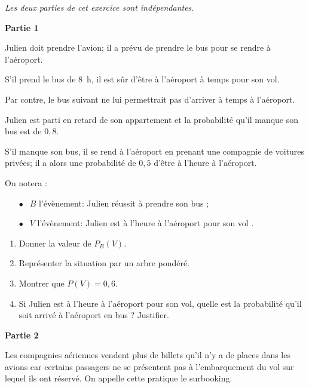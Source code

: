 \documentclass[10pt,a4paper]{article}
\begin{document}
\medskip

\begin{center}\emph{Les deux parties de cet exercice sont indépendantes.}\end{center}

\textbf{Partie 1}

\medskip

Julien doit prendre l'avion; il a prévu de prendre le bus pour se rendre à l'aéroport. 

S'il prend le bus de $8$~h, il est sûr d'être à l'aéroport à temps pour son vol.

Par contre, le bus suivant ne lui permettrait pas d'arriver à temps à l'aéroport.

Julien est parti en retard de son appartement et la probabilité qu'il manque son bus est de $0,8$.

S'il manque son bus, il se rend à l'aéroport en prenant une compagnie de voitures privées; il a alors une probabilité de $0,5$ d'être à l'heure à l'aéroport.

\smallskip

On notera :

\setlength\parindent{12mm}
\begin{itemize}
\item[$\bullet~~$] $B$ l'évènement: \og Julien réussit à prendre son bus \fg ;
\item[$\bullet~~$] $V$ l'évènement: \og Julien est à l'heure à l'aéroport pour son vol \fg.
\end{itemize}
\setlength\parindent{0mm}

\medskip

\begin{enumerate}
\item Donner la valeur de $P_B(V)$.
\item Représenter la situation par un arbre pondéré.
\item Montrer que $P(V) = 0,6$.
\item Si Julien est à l'heure à l'aéroport pour son vol, quelle est la probabilité qu'il soit arrivé à l'aéroport en bus ? Justifier.
\end{enumerate}

\bigskip

\textbf{Partie 2}

\medskip

Les compagnies aériennes vendent plus de billets qu'il n'y a de places dans les avions car certains passagers ne se présentent pas à l'embarquement du vol sur lequel ils ont réservé.
On appelle cette pratique le surbooking.
\end{document}

